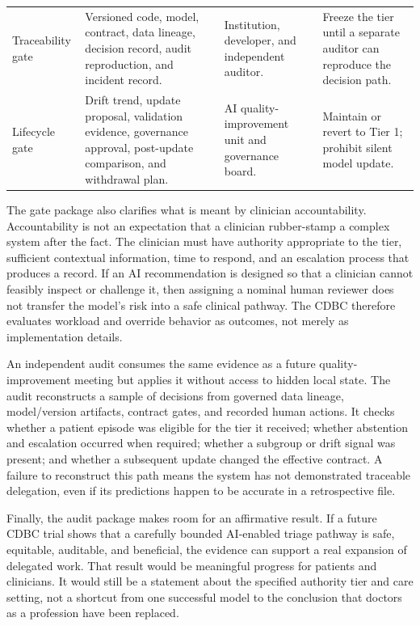 \documentclass[conference]{IEEEtran}
\begin{document}
\begin{table}[t]
\begin{tabular}{p{}p{}p{}p{}}
Traceability gate & Versioned code, model, contract, data lineage, decision record, audit reproduction, and incident record. & Institution, developer, and independent auditor. & Freeze the tier until a separate auditor can reproduce the decision path.\\
Lifecycle gate & Drift trend, update proposal, validation evidence, governance approval, post-update comparison, and withdrawal plan. & AI quality-improvement unit and governance board. & Maintain or revert to Tier 1; prohibit silent model update.\\
\bottomrule
\end{tabular}
\end{table}

The gate package also clarifies what is meant by clinician accountability. Accountability is not an expectation that a clinician rubber-stamp a complex system after the fact. The clinician must have authority appropriate to the tier, sufficient contextual information, time to respond, and an escalation process that produces a record. If an AI recommendation is designed so that a clinician cannot feasibly inspect or challenge it, then assigning a nominal human reviewer does not transfer the model's risk into a safe clinical pathway. The CDBC therefore evaluates workload and override behavior as outcomes, not merely as implementation details.

An independent audit consumes the same evidence as a future quality-improvement meeting but applies it without access to hidden local state. The audit reconstructs a sample of decisions from governed data lineage, model/version artifacts, contract gates, and recorded human actions. It checks whether a patient episode was eligible for the tier it received; whether abstention and escalation occurred when required; whether a subgroup or drift signal was present; and whether a subsequent update changed the effective contract. A failure to reconstruct this path means the system has not demonstrated traceable delegation, even if its predictions happen to be accurate in a retrospective file.

Finally, the audit package makes room for an affirmative result. If a future CDBC trial shows that a carefully bounded AI-enabled triage pathway is safe, equitable, auditable, and beneficial, the evidence can support a real expansion of delegated work. That result would be meaningful progress for patients and clinicians. It would still be a statement about the specified authority tier and care setting, not a shortcut from one successful model to the conclusion that doctors as a profession have been replaced.
\end{document}
